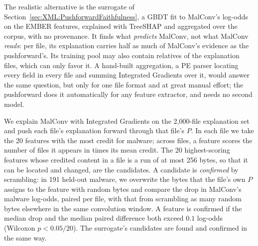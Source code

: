 The realistic alternative is the surrogate of Section~\ref{sec:XML:PushforwardFaithfulness}, a GBDT fit to MalConv's
log-odds on the EMBER features, explained with TreeSHAP and aggregated over the corpus, with no provenance. It finds
what \emph{predicts} MalConv, not what MalConv \emph{reads}: per file, its explanation carries half as much of MalConv's
evidence as the pushforward's. Its training pool may also
contain relatives of the explanation files, which can only favor it. A hand-built aggregation, a PE parser locating
every field in every file and summing Integrated Gradients over it, would answer the same question, but only for one
file format and at great manual effort; the pushforward does it automatically for any feature extractor, and needs no
second model.

We explain MalConv with Integrated Gradients on the 2{,}000-file explanation set and push each file's explanation
forward through that file's $P$. In each file we take the 20 features with the most credit for malware; across files, a
feature scores the number of files it appears in times its mean credit. The 20 highest-scoring features whose credited
content in a file is a run of at most 256 bytes, so that it can be located and changed, are the candidates. A
candidate is \emph{confirmed} by scrambling: in 191 held-out malware, we overwrite the bytes that the file's own $P$
assigns to the feature with random bytes and compare the drop in MalConv's malware log-odds, paired per file, with that
from scrambling as many random bytes elsewhere in the same convolution window. A feature is confirmed if the median drop
and the median paired difference both exceed $0.1$ log-odds (Wilcoxon $p < 0.05/20$). The surrogate's candidates are
found and confirmed in the same way.

